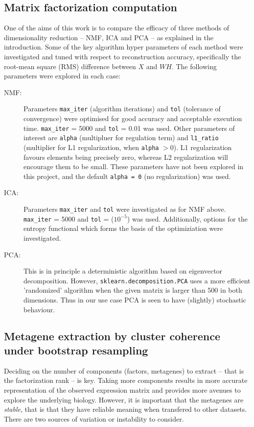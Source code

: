 \documentclass[tikz, 12pt,a4paper,oneside,fleqn]{article}
\begin{document}
\subsection{Matrix factorization computation}
One of the aims of this work is to compare the efficacy of three methods of dimensionality reduction -- NMF, ICA and PCA -- as explained in the introduction.     
Some of the key algorithm hyper parameters of each method were investigated and tuned with respect to reconstruction accuracy, specifically the root-mean square (RMS) difference between $X$ and $W H$. The following parameters were explored in each case:
\begin{description}
\item[NMF:] Parameters {\tt max\_iter} (algorithm iterations) and {\tt tol} (tolerance of convergence) were optimised for good accuracy and acceptable execution time.   
{\tt max\_iter} = 5000 and {\tt tol} = 0.01 was used.
Other parameters of interest are {\tt alpha} (multipluer for regulation term) and {\tt l1\_ratio} (multiplier for L1 regularization, when {\tt alpha} $> 0$).  L1 regularization  favours elements being precisely zero, whereas L2 regularization will encourage them to be small.  These parameters have not been explored in this project, and the default {\tt alpha = 0} (no regularization) was used.
\item[ICA:]  Parameters {\tt max\_iter} and {\tt tol} were investigated as for NMF above. 
{\tt max\_iter} = 5000 and {\tt tol} = ($10^{-5}$) was used.
Additionally, options for the entropy functional which forms the basis of the optimiziation were investigated.
\item[PCA:] This is in principle a deterministic algorithm based on eigenvector decomposition.  However, {\tt sklearn.decomposition.PCA} uses a more efficient 'randomized' algorithm when the given matrix is larger than 500 in both dimensions.  Thus in our use case PCA is seen to have (slightly) stochastic behaviour.
\end{description}

\subsection{Metagene extraction by cluster coherence under bootstrap resampling}
\label{sec-metagene-selection}
Deciding on the number of components (factors, metagenes) to extract -- that is the factorization rank -- is key.  Taking more components results in more accurate representation of the observed expression matrix and provides more avenues to explore the underlying biology.  However, it is important that the metagenes are \emph{stable}, that is that they have reliable meaning when transfered to other datasets.   There are two sources of variation or instability to consider.
\end{document}
